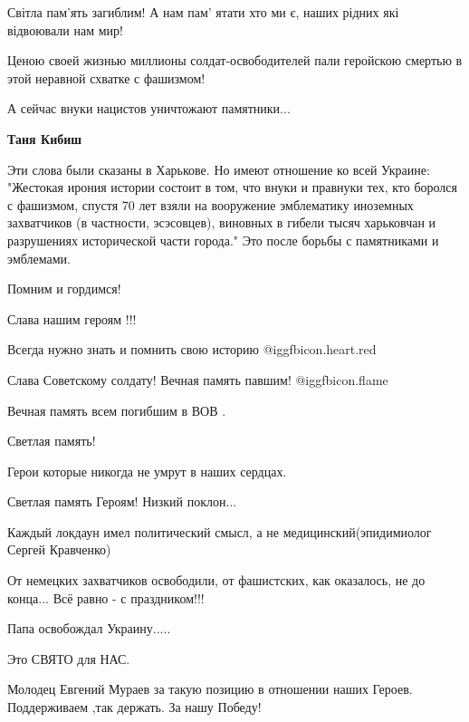 \begin{itemize}
Світла пам'ять загиблим! А нам пам' ятати хто ми є, наших рідних які відвоювали нам мир!


Ценою своей жизнью миллионы солдат-освободителей пали геройскою смертью в этой неравной схватке с фашизмом!

А сейчас внуки нацистов уничтожают памятники...

\begin{itemize} %
\textbf{Таня Кибиш} 

Эти слова были сказаны в Харькове. Но имеют отношение ко всей Украине:
"Жестокая ирония истории состоит в том, что внуки и правнуки тех, кто боролся с
фашизмом, спустя 70 лет взяли на вооружение эмблематику иноземных захватчиков
(в частности, эсэсовцев), виновных в гибели тысяч харьковчан и разрушениях
исторической части города." Это после борьбы с памятниками и эмблемами.

\end{itemize} %

Помним и гордимся!

Слава нашим героям !!!

Всегда нужно знать и помнить свою историю @igg{fbicon.heart.red} ️ 

Слава Советскому солдату! Вечная память павшим! @igg{fbicon.flame} 

Вечная память всем погибшим в ВОВ .

Светлая память!

Герои которые никогда не умрут в наших сердцах.

Светлая память Героям! Низкий поклон...

Каждый локдаун имел политический смысл, а не медицинский(эпидимиолог Сергей Кравченко)

От немецких захватчиков освободили, от фашистских, как оказалось, не до конца...
Всё равно - с праздником!!!

Папа освобождал Украину.....

Это СВЯТО для НАС.

Молодец Евгений Мураев за такую позицию в отношении наших Героев. Поддерживаем ,так держать. За нашу Победу!


\end{itemize}
